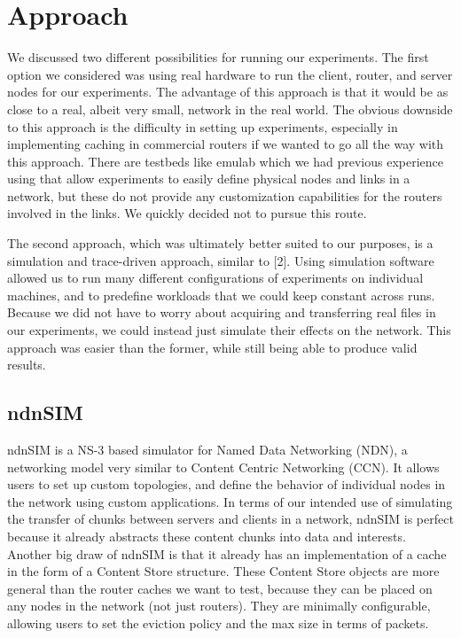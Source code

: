 \section{Approach} \label{sec:approach}
We discussed two different possibilities for running our experiments. The first
option we considered was using real hardware to run the client, router, and
server nodes for our experiments. The advantage of this approach is that it
would be as close to a real, albeit very small, network in the real world. The
obvious downside to this approach is the difficulty in setting up experiments,
especially in implementing caching in commercial routers if we wanted to go all
the way with this approach. There are testbeds like emulab which we had
previous experience using that allow experiments to easily define physical nodes
and links in a network, but these do not provide any customization capabilities
for the routers involved in the links. We quickly decided not to pursue this
route.

The second approach, which was ultimately better suited to our purposes, is a
simulation and trace-driven approach, similar to [2]. Using simulation software
allowed us to run many different configurations of experiments on individual
machines, and to predefine workloads that we could keep constant across runs.
Because we did not have to worry about acquiring and  transferring real files in
our experiments, we could instead just simulate their effects on the network.
This approach was easier than the former, while still being able to produce
valid results.

\subsection{ndnSIM} \label{sec:ndnSIM}
ndnSIM is a NS-3 based simulator for Named Data Networking (NDN), a networking
model very similar to Content Centric Networking (CCN). It allows users to set
up custom topologies, and define the behavior of individual nodes in the network
using custom applications. In terms of our intended use of simulating the
transfer of chunks between servers and clients in a network, ndnSIM is perfect
because it already abstracts these content chunks into data and interests.
Another big draw of ndnSIM is that it already has an implementation of a cache
in the form of a Content Store structure. These Content Store objects are more
general than the router caches we want to test, because they can be placed on
any nodes in the network (not just routers). They are minimally configurable,
allowing users to set the eviction policy and the max size in terms of packets. 
